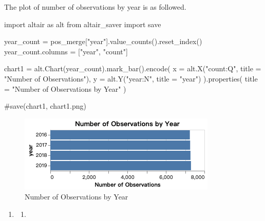 \documentclass[
  letterpaper,
  DIV=11,
  numbers=noendperiod]{scrartcl}
\newenvironment{Shaded}{\begin{snugshade}}{\end{snugshade}}
\newcommand{\CommentTok}[1]{\textcolor[rgb]{0.37,0.37,0.37}{#1}}
\newcommand{\ImportTok}[1]{\textcolor[rgb]{0.00,0.46,0.62}{#1}}
\newcommand{\NormalTok}[1]{\textcolor[rgb]{0.00,0.23,0.31}{#1}}
\newcommand{\OperatorTok}[1]{\textcolor[rgb]{0.37,0.37,0.37}{#1}}
\newcommand{\StringTok}[1]{\textcolor[rgb]{0.13,0.47,0.30}{#1}}
\providecommand{\tightlist}{%
  \setlength{\itemsep}{0pt}\setlength{\parskip}{0pt}}\usepackage{longtable,booktabs,array}
\begin{document}
The plot of number of observations by year is as followed.

\begin{Shaded}
\begin{Highlighting}[]
\ImportTok{import}\NormalTok{ altair }\ImportTok{as}\NormalTok{ alt}
\ImportTok{from}\NormalTok{ altair\_saver }\ImportTok{import}\NormalTok{ save}

\NormalTok{year\_count }\OperatorTok{=}\NormalTok{ pos\_merge[}\StringTok{"year"}\NormalTok{].value\_counts().reset\_index()}
\NormalTok{year\_count.columns }\OperatorTok{=}\NormalTok{ [}\StringTok{"year"}\NormalTok{, }\StringTok{"count"}\NormalTok{]}

\NormalTok{chart1 }\OperatorTok{=}\NormalTok{ alt.Chart(year\_count).mark\_bar().encode(}
\NormalTok{    x }\OperatorTok{=}\NormalTok{ alt.X(}\StringTok{"count:Q"}\NormalTok{, title }\OperatorTok{=} \StringTok{"Number of Observations"}\NormalTok{),}
\NormalTok{    y }\OperatorTok{=}\NormalTok{ alt.Y(}\StringTok{"year:N"}\NormalTok{, title }\OperatorTok{=} \StringTok{"year"}\NormalTok{)}
\NormalTok{).properties(}
\NormalTok{    title }\OperatorTok{=} \StringTok{"Number of Observations by Year"}
\NormalTok{)}

\CommentTok{\#save(chart1, \textquotesingle{}chart1.png\textquotesingle{})}
\end{Highlighting}
\end{Shaded}

\begin{figure}[H]

{\centering \includegraphics{chart1.png}

}

\caption{Number of Observations by Year}

\end{figure}%

\begin{enumerate}
\def\labelenumi{\arabic{enumi}.}
\tightlist
\item
  \begin{enumerate}
  \def\labelenumii{\alph{enumii}.}
  \tightlist
  \item
  \end{enumerate}
\end{enumerate}
\end{document}
